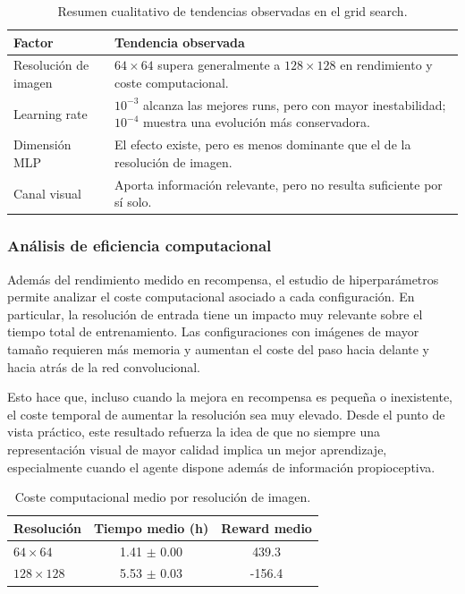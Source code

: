 \documentclass[10pt,twocolumn]{article}
\begin{document}
\begin{table}[H]
\centering
\caption{Resumen cualitativo de tendencias observadas en el grid search.}
\label{tab:grid_trends}
\begin{tabular}{p{3.0cm}p{3.8cm}}
\toprule
Factor & Tendencia observada \\
\midrule
Resolución de imagen & \(64\times64\) supera generalmente a \(128\times128\) en rendimiento y coste computacional. \\
Learning rate & \(10^{-3}\) alcanza las mejores runs, pero con mayor inestabilidad; \(10^{-4}\) muestra una evolución más conservadora. \\
Dimensión MLP & El efecto existe, pero es menos dominante que el de la resolución de imagen. \\
Canal visual & Aporta información relevante, pero no resulta suficiente por sí solo. \\
\bottomrule
\end{tabular}
\end{table}

\subsubsection{Análisis de eficiencia computacional}

Además del rendimiento medido en recompensa, el estudio de hiperparámetros permite analizar el coste computacional asociado a cada configuración. En particular, la resolución de entrada tiene un impacto muy relevante sobre el tiempo total de entrenamiento. Las configuraciones con imágenes de mayor tamaño requieren más memoria y aumentan el coste del paso hacia delante y hacia atrás de la red convolucional.

Esto hace que, incluso cuando la mejora en recompensa es pequeña o inexistente, el coste temporal de aumentar la resolución sea muy elevado. Desde el punto de vista práctico, este resultado refuerza la idea de que no siempre una representación visual de mayor calidad implica un mejor aprendizaje, especialmente cuando el agente dispone además de información propioceptiva.

\begin{table}[H]
\centering
\caption{Coste computacional medio por resolución de imagen.}
\label{tab:cost_by_resolution}
\begin{tabular}{lcc}
\toprule
Resolución & Tiempo medio (h) & Reward medio \\
\midrule
$64\times64$ & 1.41 $\pm$ 0.00 & 439.3 \\
$128\times128$ & 5.53 $\pm$ 0.03 & -156.4 \\
\bottomrule
\end{tabular}
\end{table}
\end{document}
